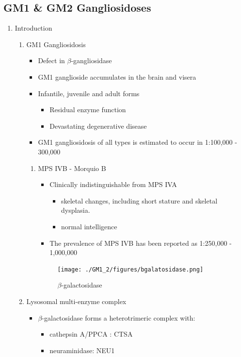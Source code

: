\documentclass{scrartcl}
\begin{document}
\subsection{GM1 \& GM2 Gangliosidoses}
\label{sec:orgc111f74}
\begin{enumerate}
\item Introduction
\label{sec:org8cdf37c}
\begin{enumerate}
\item GM1 Gangliosidosis
\label{sec:org62665f0}
\begin{itemize}
\item Defect in \(\beta\)-gangliosidase
\item GM1 ganglioside accumulates in the brain and visera
\item Infantile, juvenile and adult forms
\begin{itemize}
\item Residual enzyme function
\item Devastating degenerative disease
\end{itemize}
\item GM1 gangliosidosis of all types is estimated to occur in 1:100,000 - 300,000
\end{itemize}

\begin{enumerate}
\item MPS IVB - Morquio B
\label{sec:org30160d6}
\begin{itemize}
\item Clinically indistinguishable from MPS IVA
\begin{itemize}
\item skeletal changes, including short stature and skeletal dysplasia.
\item normal intelligence
\end{itemize}
\item The prevalence of MPS IVB has been reported as 1:250,000 - 1,000,000
\end{itemize}

\begin{figure}[htbp]
\centering
\texttt{[image: ./GM1\_2/figures/bgalatosidase.png]}
\caption{\label{fig:orgebdeec2}
\(\beta\)-galactosidase}
\end{figure}
\end{enumerate}


\item Lysosomal multi-enzyme complex
\label{sec:org3989e40}

\begin{itemize}
\item \(\beta\)-galactosidase forms a heterotrimeric complex with:
\begin{itemize}
\item cathepsin A/PPCA : CTSA
\item neuraminidase: NEU1
\end{itemize}


\end{itemize}
\end{enumerate}
\end{enumerate}
\end{document}
